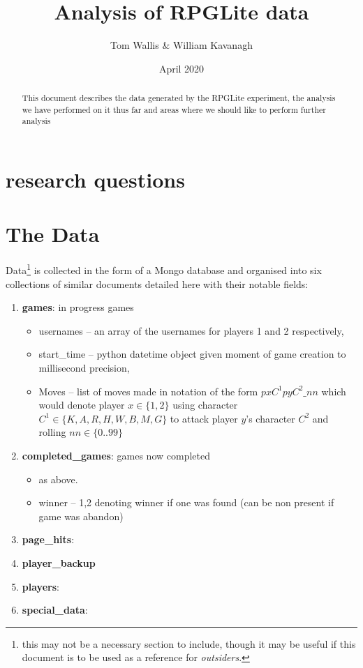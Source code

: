 \documentclass{tufte-handout}
\title{Analysis of RPGLite data}
\author[]{Tom Wallis \& William Kavanagh}
\date{April 2020}  %
\begin{document}
\maketitle%

\begin{abstract}
\noindent This document describes the data generated by the RPGLite experiment, the analysis we have performed on it thus far and areas where we should like to perform further analysis
\end{abstract}


\section{research questions}



\section{The Data}


Data\footnote{this may not be a necessary section to include, though it may be useful if this document is to be used as a reference for \textit{outsiders}.} is collected in the form of a Mongo database and organised into six collections of similar documents detailed here with their notable fields:
\begin{enumerate}
    \item \textbf{games}: in progress games
    \begin{itemize}
        \item usernames -- an array of the usernames for players 1 and 2 respectively,
        \item start\_time -- python datetime object given moment of game creation to millisecond precision,
        \item Moves -- list of moves made in notation of the form $pxC^1pyC^2\_nn$ which would denote player $x \in \{1,2\}$ using character $C^1 \in \{K,A,R,H,W,B,M,G\}$  to attack player $y$'s character $C^2$ and rolling $nn \in \{0..99\}$ 
    \end{itemize}
    \item \textbf{completed\_games}: games now completed
        \begin{itemize}
        \item as above.
        \item winner -- {1,2} denoting winner if one was found (can be non present if game was abandon)
    \end{itemize}
    \item \textbf{page\_hits}:
    \item \textbf{player\_backup}
    \item \textbf{players}:
    \item \textbf{special\_data}:
\end{enumerate}
\end{document}
